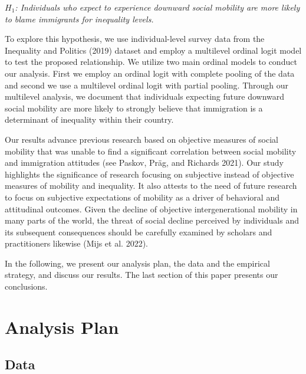 \documentclass[
  11pt,
]{article}
\begin{document}
\vspace{0.4cm}

\noindent\textit {$H_{1}$: Individuals who expect to experience downward social mobility are more likely to blame immigrants for inequality levels.}

\vspace{0.4cm}

\noindent To explore this hypothesis, we use individual-level survey
data from the Inequality and Politics (2019) dataset and employ a
multilevel ordinal logit model to test the proposed relationship. We
utilize two main ordinal models to conduct our analysis. First we employ
an ordinal logit with complete pooling of the data and second we use a
multilevel ordinal logit with partial pooling. Through our multilevel
analysis, we document that individuals expecting future downward social
mobility are more likely to strongly believe that immigration is a
determinant of inequality within their country.

Our results advance previous research based on objective measures of
social mobility that was unable to find a significant correlation
between social mobility and immigration attitudes (see Paskov, Präg, and
Richards 2021). Our study highlights the significance of research
focusing on subjective instead of objective measures of mobility and
inequality. It also attests to the need of future research to focus on
subjective expectations of mobility as a driver of behavioral and
attitudinal outcomes. Given the decline of objective intergenerational
mobility in many parts of the world, the threat of social decline
perceived by individuals and its subsequent consequences should be
carefully examined by scholars and practitioners likewise (Mijs et al.
2022).

In the following, we present our analysis plan, the data and the
empirical strategy, and discuss our results. The last section of this
paper presents our conclusions.

\hypertarget{analysis-plan}{%
\section{Analysis Plan}\label{analysis-plan}}

\hypertarget{data}{%
\subsection{\texorpdfstring{\textbf{Data}}{Data}}\label{data}}
\end{document}
